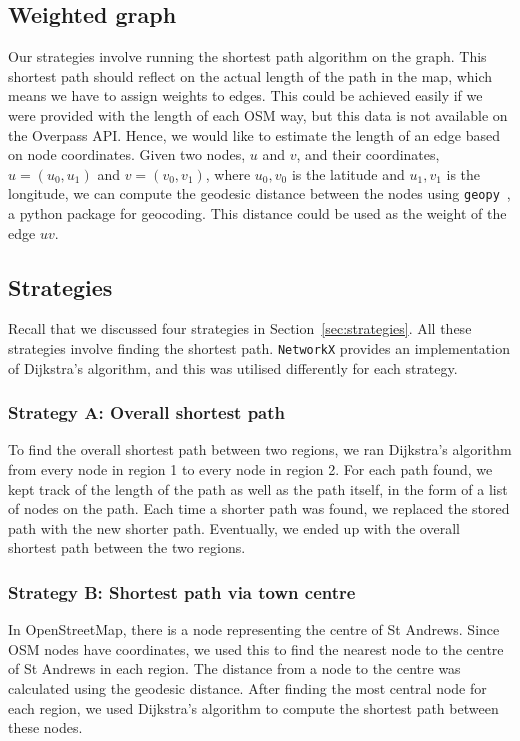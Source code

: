 \documentclass[12pt,a4paper]{report}
\begin{document}
\subsection{Weighted graph}
Our strategies involve running the shortest path algorithm on the graph. This shortest path should reflect on the actual length of the path in the map, which means we have to assign weights to edges. This could be achieved easily if we were provided with the length of each OSM way, but this data is not available on the Overpass API. Hence, we would like to estimate the length of an edge based on node coordinates. Given two nodes, $u$ and $v$, and their coordinates, $u = (u_0, u_1)$ and $v = (v_0, v_1)$, where $u_0, v_0$ is the latitude and $u_1, v_1$ is the longitude, we can compute the geodesic distance between the nodes using \texttt{geopy}~\cite{geopy}, a python package for geocoding. This distance could be used as the weight of the edge $uv$.

\subsection{Strategies}
Recall that we discussed four strategies in Section~\ref{sec:strategies}. All these strategies involve finding the shortest path. \texttt{NetworkX} provides an implementation of Dijkstra's algorithm, and this was utilised differently for each strategy. 

\subsubsection*{Strategy A: Overall shortest path}
To find the overall shortest path between two regions, we ran Dijkstra's algorithm from every node in region 1 to every node in region 2. For each path found, we kept track of the length of the path as well as the path itself, in the form of a list of nodes on the path. Each time a shorter path was found, we replaced the stored path with the new shorter path. Eventually, we ended up with the overall shortest path between the two regions.

\subsubsection*{Strategy B: Shortest path via town centre}
In OpenStreetMap, there is a node representing the centre of St Andrews. Since OSM nodes have coordinates, we used this to find the nearest node to the centre of St Andrews in each region. The distance from a node to the centre was calculated using the geodesic distance. After finding the most central node for each region, we used Dijkstra's algorithm to compute the shortest path between these nodes.
\end{document}
